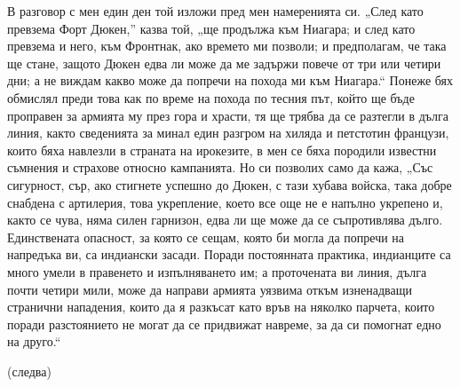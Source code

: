 \documentclass[12pt]{book}
\begin{document}
В разговор с мен един ден той изложи пред мен намеренията си. „След като превзема Форт Дюкен,” казва той, „ще продължа към Ниагара; и след като превзема и него, към Фронтнак, ако времето ми позволи; и предполагам, че така ще стане, защото Дюкен едва ли може да ме задържи повече от три или четири дни; а не виждам какво може да попречи на похода ми към Ниагара.“ Понеже бях обмислял преди това как по време на похода по тесния път, който ще бъде проправен за армията му през гора и храсти, тя ще трябва да се разтегли в дълга линия, както сведенията за минал един разгром на хиляда и петстотин французи, които бяха навлезли в страната на ирокезите, в мен се бяха породили известни съмнения и страхове относно кампанията. Но си позволих само да кажа, „Със сигурност, сър, ако стигнете успешно до Дюкен, с тази хубава войска, така добре снабдена с артилерия, това укрепление, което все още не е напълно укрепено и, както се чува, няма силен гарнизон, едва ли ще може да се съпротивлява дълго. Единствената опасност, за която се сещам, която би могла да попречи на напредъка ви, са индиански засади. Поради постоянната практика, индианците са много умели в правенето и изпълняването им; а проточената ви линия, дълга почти четири мили, може да направи армията уязвима откъм изненадващи странични нападения, които да я разкъсат като връв на няколко парчета, които поради разстоянието не могат да се придвижат навреме, за да си помогнат едно на друго.“

(следва)
\end{document}
